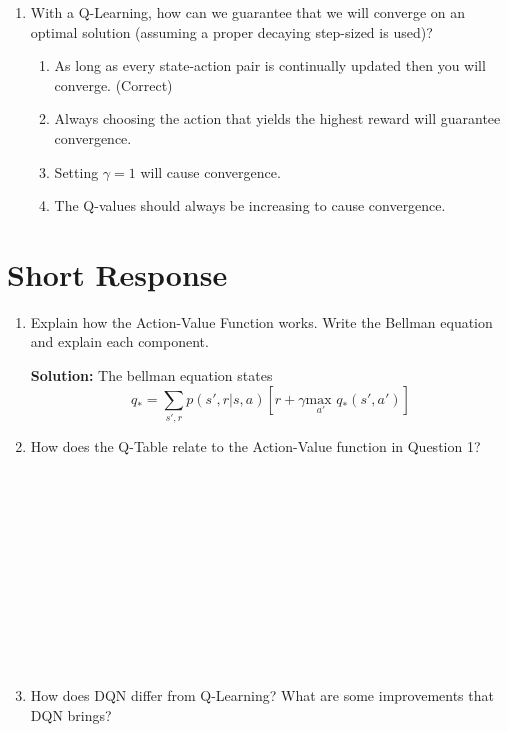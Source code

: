 \documentclass{exam}
\begin{document}
\begin{enumerate}
    \item With a Q-Learning, how can we guarantee that we will converge on an optimal solution (assuming a proper decaying step-sized is used)?
        \begin{enumerate}
            \item As long as every state-action pair is continually updated then you will converge. (Correct)\\
                \textit{}
            \item Always choosing the action that yields the highest reward will guarantee convergence.
            \item Setting $\gamma = 1$ will cause convergence.
            \item The Q-values should always be increasing to cause convergence.
        \end{enumerate}
\end{enumerate}


\section{Short Response}
\begin{enumerate}
    \item Explain how the Action-Value Function works. Write the Bellman equation and explain each component.
    
    \textbf{Solution:} The bellman equation states
    \[q_{*} = \sum_{s', r} p(s', r| s, a) \left[r + \gamma \underset{a'}{\text{max }} q_{*}(s',a')\right] \]

    \item How does the Q-Table relate to the Action-Value function in Question 1?
    \\
    \\
    \\
    \\
    \\
    \\
    \\
    \\
    \\
    \\
    \\
    \\
    \item How does DQN differ from Q-Learning? What are some improvements that DQN brings?
    \\
    \\
    \\
    \\
    \\
    \\
    \\
    \\
    \\
    \\
    \\
    \\
\end{enumerate}
\newpage
\end{document}

